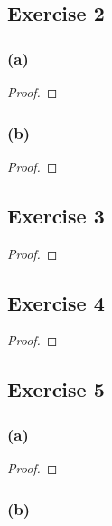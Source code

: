 \documentclass[14pt]{extarticle}
\begin{document}
\subsection{Exercise 2}

\subsubsection{(a)}

\begin{proof}

\end{proof}

\subsubsection{(b)}

\begin{proof}

\end{proof}

\subsection{Exercise 3}

\begin{proof}

\end{proof}

\subsection{Exercise 4}

\begin{proof}

\end{proof}

\subsection{Exercise 5}

\subsubsection{(a)}

\begin{proof}

\end{proof}

\subsubsection{(b)}
\end{document}
